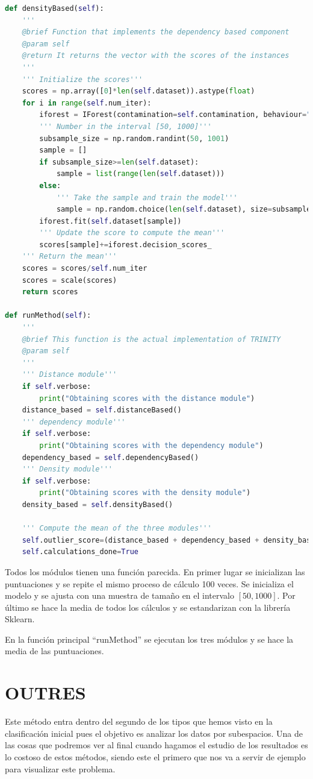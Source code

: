 \begin{lstlisting}[language=Python]
def densityBased(self):
	'''
	@brief Function that implements the dependency based component
	@param self
	@return It returns the vector with the scores of the instances
	'''
	''' Initialize the scores'''
	scores = np.array([0]*len(self.dataset)).astype(float)
	for i in range(self.num_iter):
		iforest = IForest(contamination=self.contamination, behaviour="new")
		''' Number in the interval [50, 1000]'''
		subsample_size = np.random.randint(50, 1001)
		sample = []
		if subsample_size>=len(self.dataset):
			sample = list(range(len(self.dataset)))
		else:
			''' Take the sample and train the model'''
			sample = np.random.choice(len(self.dataset), size=subsample_size, replace=False)
		iforest.fit(self.dataset[sample])
		''' Update the score to compute the mean'''
		scores[sample]+=iforest.decision_scores_
	''' Return the mean'''
	scores = scores/self.num_iter
	scores = scale(scores)
	return scores

def runMethod(self):
	'''
	@brief This function is the actual implementation of TRINITY
	@param self
	'''
	''' Distance module'''
	if self.verbose:
		print("Obtaining scores with the distance module")
	distance_based = self.distanceBased()
	''' dependency module'''
	if self.verbose:
		print("Obtaining scores with the dependency module")
	dependency_based = self.dependencyBased()
	''' Density module'''
	if self.verbose:
		print("Obtaining scores with the density module")
	density_based = self.densityBased()
	
	''' Compute the mean of the three modules'''
	self.outlier_score=(distance_based + dependency_based + density_based)/3
	self.calculations_done=True
\end{lstlisting}

Todos los módulos tienen una función parecida. En primer lugar se inicializan las puntuaciones y se repite el mismo proceso de cálculo 100 veces. Se inicializa el modelo y se ajusta con una muestra de tamaño en el intervalo $[50,1000]$. Por último se hace la media de todos los cálculos y se estandarizan con la librería Sklearn.

En la función principal ``runMethod'' se ejecutan los tres módulos y se hace la media de las puntuaciones.

\section{OUTRES}

Este método entra dentro del segundo de los tipos que hemos visto en la clasificación inicial pues el objetivo es analizar los datos por subespacios. Una de las cosas que podremos ver al final cuando hagamos el estudio de los resultados es lo costoso de estos métodos, siendo este el primero que nos va a servir de ejemplo para visualizar este problema.

